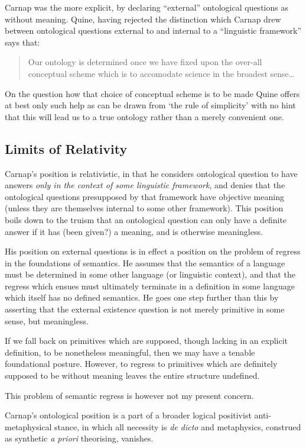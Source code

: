 \documentclass{rbjk}
\begin{document}
\begin{article}
Carnap was the more explicit, by declaring ``external'' ontological questions as without meaning.
Quine, having rejected the distinction which Carnap drew between ontological questions external to and internal to a ``linguistic framework'' says that:
\begin{quote}
Our ontology is determined once we have fixed upon the over-all conceptual scheme which is to accomodate science in the broadest sense\ldots
\end{quote}
On the question how that choice of conceptual scheme is to be made Quine offers at best only such help as can be drawn from `the rule of simplicity' with no hint that this will lead us to a true ontology rather than a merely convenient one.

\subsection{Limits of Relativity}

Carnap's position is relativistic, in that he considers ontological question to have answers {\it only in the context of some linguistic framework}, and denies that the ontological questions presupposed by that framework have objective meaning (unless they are themselves internal to some other framework).
This position boils down to the truism that an ontological question can only have a definite answer if it has (been given?) a meaning, and is otherwise meaningless.

His position on external questions is in effect a position on the problem of regress in the foundations of semantics.
He assumes that the semantics of a language must be determined in some other language (or linguistic context), and that the regress which ensues must ultimately terminate in a definition in some language which itself has no defined semantics.
He goes one step further than this by asserting that the external existence question is not merely primitive in some sense, but meaningless.

If we fall back on primitives which are supposed, though lacking in an explicit definition, to be nonetheless meaningful, then we may have a tenable foundational posture.
However, to regress to primitives which are definitely supposed to be without meaning leaves the entire structure undefined.

This problem of semantic regress is however not my present concern.

Carnap's ontological position is a part of a broader logical positivist anti-metaphysical stance, in which all necessity is {\it de dicto} and metaphysics, construed as synthetic {\it a priori} theorising, vanishes.




\end{article}
\end{document}
